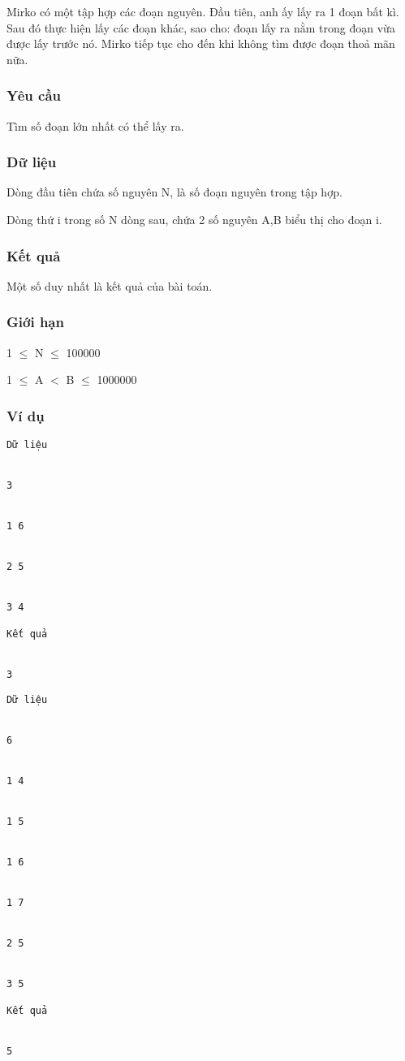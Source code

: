



   Mirko có một tập hợp các đoạn nguyên. Đầu tiên, anh ấy lấy ra 1 đoạn bất kì. Sau đó thực hiện lấy các đoạn khác, sao cho: đoạn lấy ra nằm trong đoạn vừa được lấy trước nó. Mirko tiếp tục cho đến khi không tìm được đoạn thoả mãn nữa.  

\subsubsection{   Yêu cầu  }

   Tìm số đoạn lớn nhất có thể lấy ra.  

\subsubsection{   Dữ liệu  }

   Dòng đầu tiên chứa số nguyên N, là số đoạn nguyên trong tập hợp.  

   Dòng thứ i trong số N dòng sau, chứa 2 số nguyên A,B  biểu thị cho đoạn i.  

\subsubsection{   Kết quả  }

   Một số duy nhất là kết quả của bài toán.  

\subsubsection{   Giới hạn  }

   1  $\le$  N  $\le$  100000  

   1  $\le$  A $<$ B  $\le$  1000000  

\subsubsection{   Ví dụ  }
\begin{verbatim}
Dữ liệu


3


1 6


2 5


3 4
 
Kết quả


3
\end{verbatim}
\begin{verbatim}
Dữ liệu


6


1 4


1 5


1 6


1 7 


2 5 


3 5
 
Kết quả


5
\end{verbatim}
